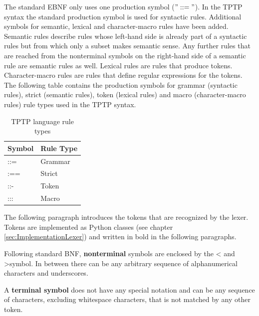 The standard \ac{EBNF} only uses one production symbol ($"::="$).
In the \ac{TPTP} syntax the standard production symbol is used for syntactic rules.
Additional symbols for semantic, lexical and character-macro rules have been added. Semantic rules describe rules whose left-hand side is already part of a syntactic rules but from which only a subset makes semantic sense. Any further rules that are reached from the nonterminal symbols on the right-hand side of a semantic rule are semantic rules as well. Lexical rules are rules that produce tokens. Character-macro rules are rules that define regular expressions for the tokens.
The following table contains the production symbols for grammar (syntactic rules), strict (semantic rules), token (lexical rules) and macro (character-macro rules) rule types used in the \ac{TPTP} syntax.

\begin{table}[H]
\centering
\caption{\ac{TPTP} language rule types \cite{VS06}}
\begin{tabular}{ll}
\textbf{Symbol} & \textbf{Rule Type}\\\hline
::= & Grammar\\
:== & Strict\\
::- & Token\\
::: & Macro\\
\end{tabular}
\label{tbl:ConceptTPTPProductionSymbols}
\end{table}

The following paragraph introduces the tokens that are recognized by the lexer. Tokens are implemented as Python classes (see chapter \ref{sec:ImplementationLexer}) and written in bold in the following paragraphs.

Following standard \ac{BNF}, \textbf{nonterminal} symbols are enclosed by the \textless\; and \textgreater \;symbol.
In between there can be any arbitrary sequence of alphanumerical characters and underscores.

A \textbf{terminal symbol} does not have any special notation and can be any sequence of characters, excluding whitespace characters, that is not matched by any other token.

